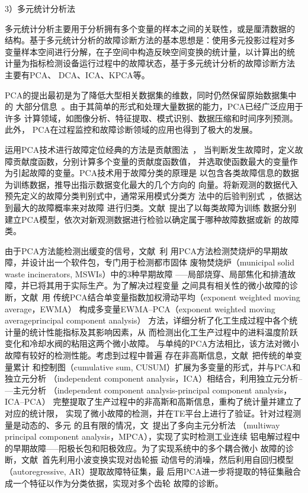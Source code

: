 3）多元统计分析法

多元统计分析主要用于分析拥有多个变量的样本之间的关联性，或是厘清数据的
结构。基于多元统计分析的故障诊断方法的基本思想是：使用多元投影过程对多
变量样本空间进行分解，在子空间中构造反映空间变换的统计量，以计算出的统
计量为指标检测设备运行过程中的故障状态，基于多元统计分析的故障诊断方法
主要有PCA、 DCA、ICA、KPCA等。

PCA的提出最初是为了降低大型相关数据集的维数，同时仍然保留原始数据集中的
大部分信息~\cite{abdi2010principal}。由于其简单的形式和处理大量数据的能力，PCA已经广泛应用于许多
计算领域，如图像分析、特征提取、模式识别、数据压缩和时间序列预测。此外，
PCA在过程监控和故障诊断领域的应用也得到了极大的发展。

运用PCA技术进行故障定位经典的方法是贡献图法~\cite{miller1998contribution}，
当判断发生故障时，定义故障贡献度函数，分别计算多个变量的贡献度函数值，
并选取使函数最大的变量作为引起故障的变量。PCA技术用于故障分类的原理是
以包含各类故障信息的数据为训练数据，推导出指示数据变化最大的几个方向的
向量。将新观测的数据代入预先定义的故障分类判别式中，通常采用模式分类方
法中的后验判别式~\cite{duda2000pattern}，依据达到最大的故障概率来对故障
进行归类。文献~提出了以每类故障为训练
数据分别建立PCA模型，依次对新观测数据进行检验以确定属于哪种故障数据或新
的故障类。

由于PCA方法能检测出缓变的信号，文献~利
用PCA方法检测焚烧炉的早期故障，并设计出一个软件包，专门用于检测都市固体
废物焚烧炉（municipal solid waste incinerators, MSWIs）中的3种早期故障
–—局部烧穿、局部焦化和排渣故障，并已将其用于实际生产。为了解决过程变量
之间具有相关性的微小故障的诊断，文献~用
传统PCA结合单变量指数加权滑动平均（exponent weighted moving average，EWMA）
构成多变量EWMA–PCA（exponent weighted moving averageprincipal component analysis）
方法，详细分析了化工生成过程中各个统计量的统计性能指标及其影响因素，从
而检测出化工生产过程中的进料温度阶跃变化和冷却水阀的粘阻这两个微小故障。
与单纯的PCA方法相比，该方法对微小故障有较好的检测性能。考虑到过程中普遍
存在非高斯信息，文献~把传统的单变量累计
和控制图（cumulative sum, CUSUM）扩展为多变量的形式，并与PCA和独立元分析
（independent component analysis，ICA）相结合，利用独立元分析–—主元分析
（independent component analysis-principal component analysis，ICA–PCA）
完整提取了生产过程中的非高斯和高斯信息，重构了统计量并建立了对应的统计限，
实现了微小故障的检测，并在TE平台上进行了验证。针对过程测量是动态的、多元
的且有限的情况，文~提出了多向主元分析法
（multiway principal component analysis，MPCA），实现了实时检测工业连续
铝电解过程中的早期故障–—阳极长包和阳极效应。为了实现系统中的多个耦合微小
故障的诊断，文献~首先利用小波变换实现对齿轮振
动信号的消噪，然后利用自回归模型（autoregressive, AR）提取故障特征集，最
后用PCA进一步将提取的特征集融合成一个特征以作为分类依据，实现对多个齿轮
故障的诊断。

